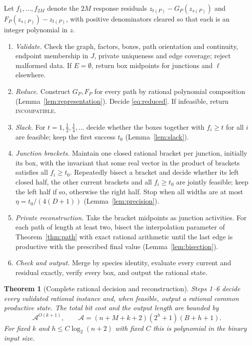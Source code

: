 \documentclass[11pt,a4paper]{article}
\theoremstyle{plain}
\newtheorem{theorem}{Theorem}[section]
\theoremstyle{definition}
\theoremstyle{remark}
\newcommand{\Abound}{\mathcal{A}}
\begin{document}
Let $f_1,\dots,f_{2M}$ denote the $2M$ response residuals $z_{t(P)}-G_P(z_{s(P)})$ and $F_P(z_{s(P)})-z_{t(P)}$, with positive denominators cleared so that each is an integer polynomial in $z$.
\begin{enumerate}[label=\textbf{Step \arabic*.},leftmargin=*,align=left]
\item \emph{Validate.} Check the graph, factors, boxes, path orientation and continuity, endpoint membership in $J$, private uniqueness and edge coverage; reject malformed data. If $E=\emptyset$, return box midpoints for junctions and $\ell$ elsewhere.
\item \emph{Reduce.} Construct $G_P,F_P$ for every path by rational polynomial composition (Lemma~\ref{lem:representation}). Decide \eqref{eq:reduced}. If infeasible, return \textsc{incompatible}.
\item \emph{Slack.} For $t=1,\tfrac12,\tfrac14,\dots$ decide whether the boxes together with $f_i\ge t$ for all $i$ are feasible; keep the first success $t_0$ (Lemma~\ref{lem:slack}).
\item \emph{Junction brackets.} Maintain one closed rational bracket per junction, initially its box, with the invariant that some real vector in the product of brackets satisfies all $f_i\ge t_0$. Repeatedly bisect a bracket and decide whether its left closed half, the other current brackets and all $f_i\ge t_0$ are jointly feasible; keep the left half if so, otherwise the right half. Stop when all widths are at most $\eta=t_0/(4(D+1))$ (Lemma~\ref{lem:precision}).
\item \emph{Private reconstruction.} Take the bracket midpoints as junction activities. For each path of length at least two, bisect the interpolation parameter of Theorem~\ref{thm:path} with exact rational arithmetic until the last edge is productive with the prescribed final value (Lemma~\ref{lem:bisection}).
\item \emph{Check and output.} Merge by species identity, evaluate every current and residual exactly, verify every box, and output the rational state.
\end{enumerate}

\begin{theorem}[Complete rational decision and reconstruction]\label{thm:algorithm}
Steps 1--6 decide every validated rational instance and, when feasible, output a rational common productive state. The total bit cost and the output length are bounded by
\begin{equation}\label{eq:complexity}
  \Abound^{O(k+1)},\qquad \Abound=(n+M+k+2)(2^h+1)(B+h+1).
\end{equation}
For fixed $k$ and $h\le C\log_2(n+2)$ with fixed $C$ this is polynomial in the binary input size.
\end{theorem}
\end{document}
